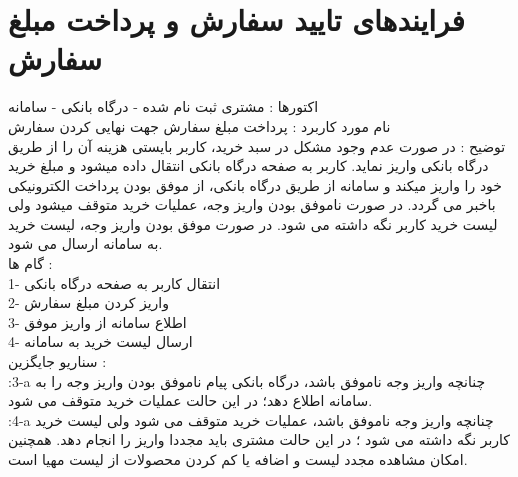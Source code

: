 \documentclass[14pt]{article}
\begin{document}
 
\section{ فرایندهای تایید سفارش و پرداخت مبلغ سفارش}
 
اکتورها : مشتری ثبت نام شده - درگاه بانکی - سامانه\\
نام مورد کاربرد : پرداخت مبلغ سفارش جهت نهایی کردن سفارش\\
توضیح : در صورت عدم وجود مشکل در سبد خرید، کاربر بایستی هزینه آن را از طریق درگاه بانکی واریز نماید. کاربر به صفحه درگاه بانکی انتقال داده میشود و مبلغ خرید خود را واریز میکند و سامانه از طریق درگاه بانکی، از موفق بودن پرداخت الکترونیکی باخبر می گردد. در صورت ناموفق بودن واریز وجه، عملیات خرید متوقف میشود ولی لیست خرید کاربر نگه داشته می شود. در صورت موفق بودن واریز وجه، لیست خرید به سامانه ارسال می شود.\\
گام ها :\\
1- انتقال کاربر به صفحه درگاه بانکی\\
2- واریز کردن مبلغ سفارش\\
3- اطلاع سامانه از واریز موفق \\
4- ارسال لیست خرید به سامانه \\
سناریو جایگزین : \\
:3-a چنانچه واریز وجه ناموفق باشد، درگاه بانکی پیام ناموفق بودن واریز وجه را به سامانه اطلاع دهد؛ در این حالت عملیات خرید متوقف می شود.\\
:4-a چنانچه واریز وجه ناموفق باشد، عملیات خرید متوقف می شود ولی لیست خرید کاربر نگه داشته می شود ؛ در این حالت مشتری باید مجددا واریز را انجام دهد. همچنین امکان مشاهده مجدد لیست و اضافه یا کم کردن محصولات از لیست مهیا است.\\
\end{document}
